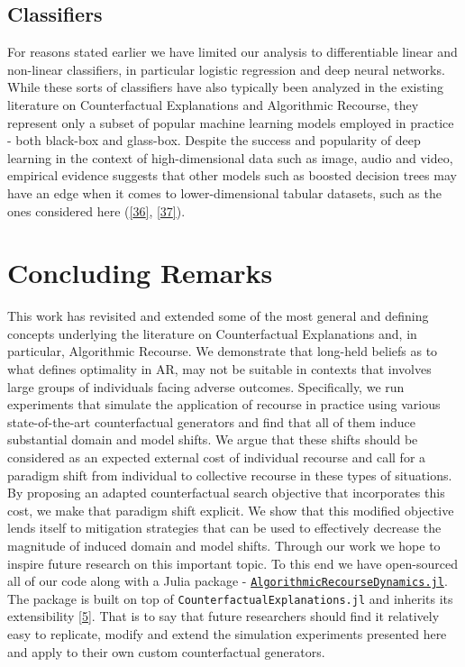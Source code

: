 \documentclass[conference,final,]{IEEEtran}
\theoremstyle{definition}
\theoremstyle{definition}
\theoremstyle{definition}
\theoremstyle{definition}
\theoremstyle{remark}
\begin{document}
\hypertarget{classifiers}{%
\subsection{Classifiers}\label{classifiers}}

For reasons stated earlier we have limited our analysis to differentiable linear and non-linear classifiers, in particular logistic regression and deep neural networks. While these sorts of classifiers have also typically been analyzed in the existing literature on Counterfactual Explanations and Algorithmic Recourse, they represent only a subset of popular machine learning models employed in practice - both black-box and glass-box. Despite the success and popularity of deep learning in the context of high-dimensional data such as image, audio and video, empirical evidence suggests that other models such as boosted decision trees may have an edge when it comes to lower-dimensional tabular datasets, such as the ones considered here (\protect\hyperlink{ref-borisov2021deep}{{[}36{]}}, \protect\hyperlink{ref-grinsztajn2022tree}{{[}37{]}}).

\hypertarget{conclusion}{%
\section{Concluding Remarks}\label{conclusion}}

This work has revisited and extended some of the most general and defining concepts underlying the literature on Counterfactual Explanations and, in particular, Algorithmic Recourse. We demonstrate that long-held beliefs as to what defines optimality in AR, may not be suitable in contexts that involves large groups of individuals facing adverse outcomes. Specifically, we run experiments that simulate the application of recourse in practice using various state-of-the-art counterfactual generators and find that all of them induce substantial domain and model shifts. We argue that these shifts should be considered as an expected external cost of individual recourse and call for a paradigm shift from individual to collective recourse in these types of situations. By proposing an adapted counterfactual search objective that incorporates this cost, we make that paradigm shift explicit. We show that this modified objective lends itself to mitigation strategies that can be used to effectively decrease the magnitude of induced domain and model shifts. Through our work we hope to inspire future research on this important topic. To this end we have open-sourced all of our code along with a Julia package - \href{https://anonymous.4open.science/r/AlgorithmicRecourseDynamics/README.md}{\texttt{AlgorithmicRecourseDynamics.jl}}. The package is built on top of \texttt{CounterfactualExplanations.jl} and inherits its extensibility \protect\hyperlink{ref-altmeyer2022CounterfactualExplanations}{{[}5{]}}. That is to say that future researchers should find it relatively easy to replicate, modify and extend the simulation experiments presented here and apply to their own custom counterfactual generators.
\end{document}
